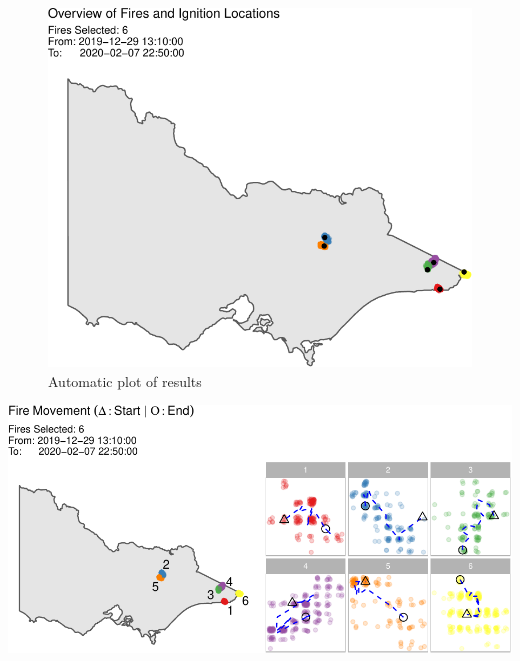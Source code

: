 \begin{Schunk}
\begin{figure}

{\centering \includegraphics[width=0.8\linewidth]{clustering_paper_files/figure-latex/unnamed-chunk-8-1} 

}

\caption[Automatic plot of results]{Automatic plot of results}\label{fig:unnamed-chunk-8}
\end{figure}
\end{Schunk}

\begin{Schunk}


\begin{center}\includegraphics[width=0.7\linewidth,height=0.7\textheight]{clustering_paper_files/figure-latex/unnamed-chunk-9-1} \end{center}

\end{Schunk}

